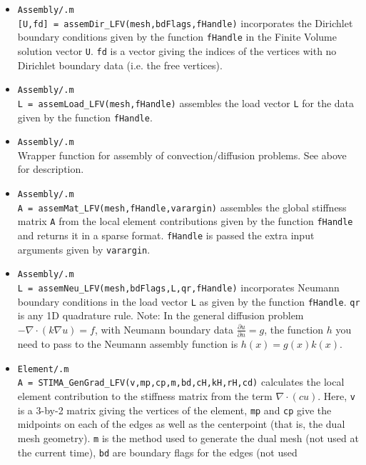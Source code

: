 \begin{itemize}
\item {\tt Assembly/.m} \\
    {\tt [U,fd] = assemDir\_LFV(mesh,bdFlags,fHandle)} incorporates the
    Dirichlet boundary conditions given by the function {\tt fHandle} in
    the Finite Volume solution vector {\tt U}. {\tt fd} is a vector
    giving the indices of the vertices with no Dirichlet boundary data
    (i.e. the free vertices).
\item {\tt Assembly/.m} \\
    {\tt L = assemLoad\_LFV(mesh,fHandle)} assembles the load vector {\tt L}
    for the data given by the function {\tt fHandle}.
\item {\tt Assembly/.m} \\
    Wrapper function for assembly of convection/diffusion problems. See
    above for description.
\item {\tt Assembly/.m}  \\
    {\tt A = assemMat\_LFV(mesh,fHandle,varargin)} assembles the global
    stiffness matrix {\tt A} from the local element contributions given
    by the function {\tt fHandle} and returns it in a sparse format.
    {\tt fHandle} is passed the extra input arguments given by {\tt varargin}.
\item {\tt Assembly/.m} \\
    {\tt L = assemNeu\_LFV(mesh,bdFlags,L,qr,fHandle)} incorporates Neumann
    boundary conditions in the load vector {\tt L} as given by the function
    {\tt fHandle}. {\tt qr} is any 1D quadrature rule. Note: In the general
    diffusion problem $-\nabla\cdot(k\nabla u)=f$, with Neumann boundary data
    $\frac{\partial u}{\partial n}=g$, the function $h$ you need to pass to
    the Neumann assembly function is $h(x)=g(x)k(x)$.
\item {\tt Element/.m} \\
    {\tt A = STIMA\_GenGrad\_LFV(v,mp,cp,m,bd,cH,kH,rH,cd)} calculates the
    local element contribution to the stiffness matrix from the term
    $\nabla\cdot(cu)$. Here, {\tt v} is a 3-by-2 matrix giving the vertices
    of the element, {\tt mp} and {\tt cp} give the midpoints on each of the
    edges as well as the centerpoint (that is, the dual mesh geometry).
    {\tt m} is the method used to generate the dual mesh (not used at the
    current time), {\tt bd} are boundary flags for the edges (not used

\end{itemize}
